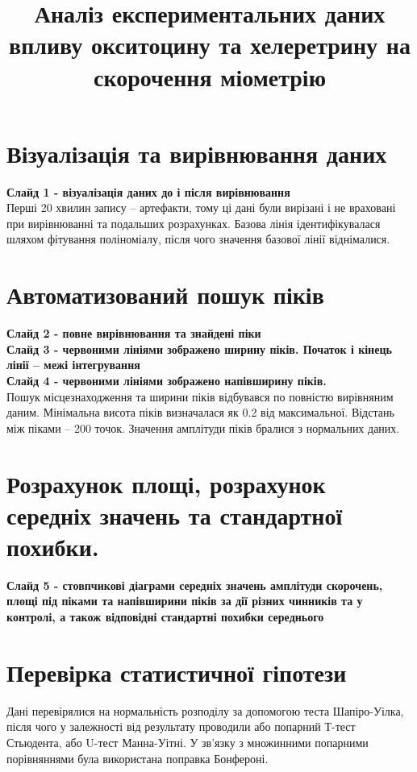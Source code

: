 \documentclass[12pt, a4paper]{article}
\title{Аналіз експериментальних даних впливу окситоцину та хелеретрину на
        скорочення міометрію}
\date{}
\begin{document}
\maketitle

\thispagestyle{empty}
\section{Візуалізація та вирівнювання даних}
\textbf{Слайд 1 - візуалізація даних до і після вирівнювання}
\\
Перші 20 хвилин запису -- артефакти, тому ці дані були вирізані і не враховані
при вирівнюванні та подальших розрахунках. Базова лінія ідентифікувалася шляхом
фітування поліноміалу, після чого значення базової лінії віднімалися.

\section{Автоматизований пошук піків}
\textbf{Слайд 2 - повне вирівнювання та знайдені піки}
\\
\textbf{Слайд 3 - червоними лініями зображено ширину піків. Початок і кінець
лінії --  межі інтегрування}
\\
\textbf{Слайд 4 - червоними лініями зображено напівширину піків.}
\\
Пошук місцезнаходження та ширини піків відбувався по повністю вирівняним даним. Мінімальна
висота піків визначалася як 0.2 від максимальної. Відстань між піками -- 200
точок. Значення амплітуди піків бралися з нормальних даних. 

\section{Розрахунок площі, розрахунок середніх значень та стандартної похибки.}
\textbf{Слайд 5 - стовпчикові діаграми середніх значень амплітуди скорочень,
площі під піками та напівширини піків за дії різних чинників та у контролі, а
також відповідні стандартні похибки середнього} 

\section{Перевірка статистичної гіпотези}
Дані перевірялися на нормальність розподілу за допомогою теста Шапіро-Уілка,
після чого у залежності від результату проводили або попарний Т-тест Стьюдента,
або U-тест Манна-Уітні. У зв'язку з множинними попарними порівняннями була
використана поправка Бонфероні.
\end{document}
